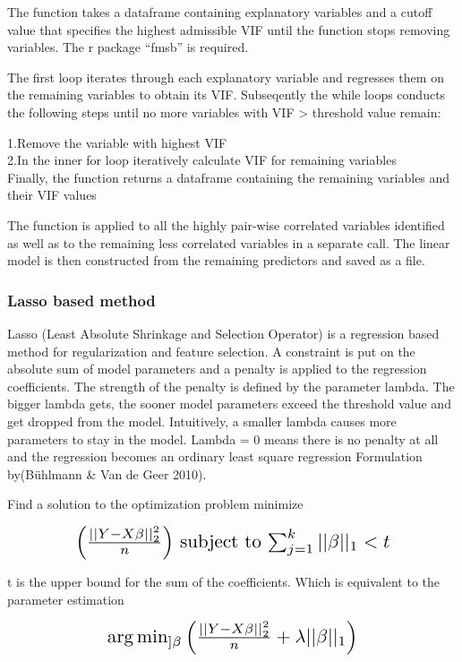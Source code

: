 \documentclass[11pt]{article}
\begin{document}
The function takes a dataframe containing explanatory variables and a cutoff value that specifies the highest admissible VIF until the function stops removing variables. The r package “fmsb” is required.

The first loop iterates through each explanatory variable and regresses them on the remaining variables
to obtain its VIF. Subseqently the while loops conducts the following steps until no more variables with
VIF > threshold value remain:

1.Remove the variable with highest VIF\\
2.In the inner for loop iteratively calculate VIF for remaining variables\\

Finally, the function returns a dataframe containing the remaining variables and their VIF values

The function is applied to all the highly pair-wise correlated variables identified  as well as to the remaining less correlated variables in a separate call. The linear model is then constructed from the remaining predictors and saved as a file.

\subsubsection{Lasso based method}

Lasso (Least Absolute Shrinkage and Selection Operator) is a regression based method for regularization and feature selection. A constraint is put on the absolute sum of model parameters and a penalty is applied to the regression coefficients. The strength of the penalty is defined by the parameter lambda. The bigger lambda gets, the sooner model parameters exceed the threshold value and get dropped from the model. Intuitively, a smaller lambda causes more parameters to stay in the model. Lambda = 0 means there is no penalty at all and the regression becomes an ordinary least square regression
Formulation by(Bühlmann \& Van de Geer 2010).

Find a solution to the optimization problem 
minimize 
\begin{center}  \[ \scalebox{1.5} {$\left ( \frac{||Y-X\beta ||^2_2}{n} \right )$ subject to  $\sum_{j=1}^{k} ||\beta ||_1<t$}\] \end{center} 

t is the upper bound for the sum of the coefficients.
Which is equivalent to the parameter estimation \\ 
\begin{center}  \[ \scalebox{1.5} {$\arg \min_{]\beta}\left (\frac{||Y-X\beta||_{2}^2}{n} +\lambda ||\beta ||_{1} \right ) $}\] \end{center} 
\end{document}
